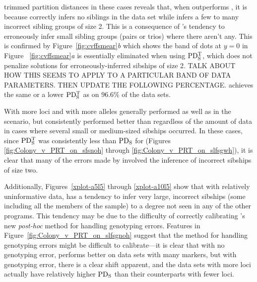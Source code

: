 trimmed partition distances in these cases reveals that, when \prt{} outperforms \colony{}, it is because
\prt{} correctly infers no siblings in the data set while \colony infers a few to many incorrect sibling groups
of size 2.  
This is a consequence of 
\colony{}'s tendency to erroneously infer small sibling groups (pairs or trios) where there aren't any.  
This is confirmed by Figure~\ref{fig:cvffsmear}{\em b} which shows the band of dots at $y=0$ in Figure~
\ref{fig:cvffsmear}{\em a} is essentially eliminated when using $\mathrm{PD_S^T}$, which does not penalize 
solutions for erroneously-inferred sibships of size 2. TALK ABOUT HOW THIS SEEMS TO APPLY TO A PARTICULAR BAND OF
DATA PARAMETERS. THEN UPDATE THE FOLLOWING PERCENTAGE. \colony{} achieves the same or a lower $\mathrm{PD_S^T}$ 
as \prt{} on 96.6\% of the data sets.   

With more loci and with more alleles \colony{} generally performed as well as \prt{} in the \nosibs{} 
scenario, but consistently performed better than \prt{} regardless of the amount of data in cases where 
several small or medium-sized sibships occurred.  In these cases, since $\mathrm{PD_S^T}$ was consistently less 
than $\mathrm{PD_S}$ for \prt{} (Figures \ref{fig:Colony_v_PRT_on_sfsnoh} through 
\ref{fig:Colony_v_PRT_on_slfsgwh}), it is clear that many of the errors made by \prt{} involved the 
inference of incorrect sibships of size two. 

Additionally, Figures~\ref{xplot-a5l5} through \ref{xplot-a10l5} show that with relatively 
uninformative data, \prt{} has a tendency to infer very large, incorrect sibships (some including all 
the members of the sample) to a degree not seen in any of the other programs. This tendency may be due 
to the difficulty of correctly calibrating \prt{}'s new {\em post-hoc} method for handling genotyping 
errors.  Features in Figure~\ref{fig:Colony_v_PRT_on_slfsgnoh} suggest that the method for handling 
genotyping errors might be difficult to calibrate---it is clear that with no genotyping error, \prt{} 
performs better on data sets with many markers, but with genotyping error, there is a clear shift 
apparent, and the data sets with more loci actually  have relatively higher $\mathrm{PD_S}$ than their 
counterparts with fewer loci. 




